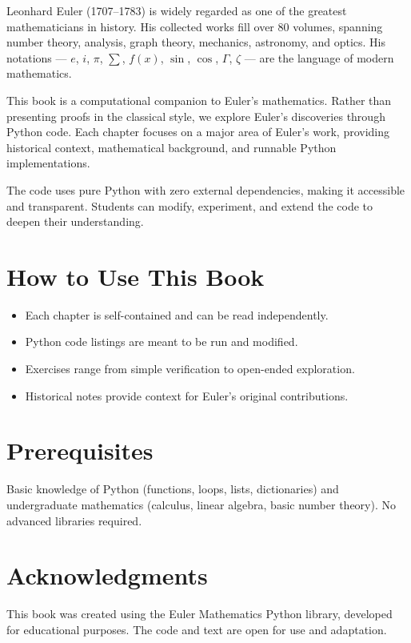 \documentclass[11pt,a4paper,twoside]{book}
\theoremstyle{eulerstyle}
\theoremstyle{definition}
\begin{document}
\begin{epigraphs}
\end{epigraphs}

Leonhard Euler (1707--1783) is widely regarded as one of the greatest mathematicians in history. His collected works fill over 80 volumes, spanning number theory, analysis, graph theory, mechanics, astronomy, and optics. His notations --- $e$, $i$, $\pi$, $\sum$, $f(x)$, $\sin$, $\cos$, $\Gamma$, $\zeta$ --- are the language of modern mathematics.

This book is a computational companion to Euler's mathematics. Rather than presenting proofs in the classical style, we explore Euler's discoveries through Python code. Each chapter focuses on a major area of Euler's work, providing historical context, mathematical background, and runnable Python implementations.

The code uses pure Python with zero external dependencies, making it accessible and transparent. Students can modify, experiment, and extend the code to deepen their understanding.

\section*{How to Use This Book}
\begin{itemize}
    \item Each chapter is self-contained and can be read independently.
    \item Python code listings are meant to be run and modified.
    \item Exercises range from simple verification to open-ended exploration.
    \item Historical notes provide context for Euler's original contributions.
\end{itemize}

\section*{Prerequisites}
Basic knowledge of Python (functions, loops, lists, dictionaries) and undergraduate mathematics (calculus, linear algebra, basic number theory). No advanced libraries required.

\section*{Acknowledgments}
This book was created using the Euler Mathematics Python library, developed for educational purposes. The code and text are open for use and adaptation.
\end{document}
